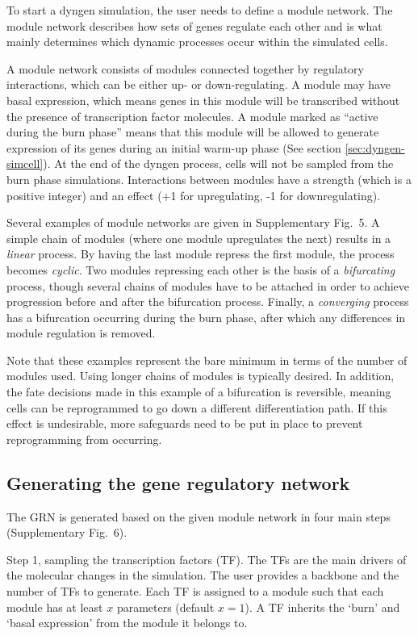 \documentclass[
  table,
  10pt,
  a4paper]{article}
\begin{document}
To start a dyngen simulation, the user needs to define a module network.
The module network describes how sets of genes regulate each other and
is what mainly determines which dynamic processes occur within the
simulated cells.

A module network consists of modules connected together by regulatory
interactions, which can be either up- or down-regulating. A module may
have basal expression, which means genes in this module will be
transcribed without the presence of transcription factor molecules. A
module marked as ``active during the burn phase'' means that this module
will be allowed to generate expression of its genes during an initial
warm-up phase (See section \ref{sec:dyngen-simcell}). At the end of the
dyngen process, cells will not be sampled from the burn phase
simulations. Interactions between modules have a strength (which is a
positive integer) and an effect (+1 for upregulating, -1 for
downregulating).

Several examples of module networks are given in Supplementary Fig.~5. A
simple chain of modules (where one module upregulates the next) results
in a \emph{linear} process. By having the last module repress the first
module, the process becomes \emph{cyclic}. Two modules repressing each
other is the basis of a \emph{bifurcating} process, though several
chains of modules have to be attached in order to achieve progression
before and after the bifurcation process. Finally, a \emph{converging}
process has a bifurcation occurring during the burn phase, after which
any differences in module regulation is removed.

Note that these examples represent the bare minimum in terms of the
number of modules used. Using longer chains of modules is typically
desired. In addition, the fate decisions made in this example of a
bifurcation is reversible, meaning cells can be reprogrammed to go down
a different differentiation path. If this effect is undesirable, more
safeguards need to be put in place to prevent reprogramming from
occurring.

\hypertarget{sec:dyngen-grn}{%
\subsection{Generating the gene regulatory
network}\label{sec:dyngen-grn}}

The GRN is generated based on the given module network in four main
steps (Supplementary Fig.~6).

Step 1, sampling the transcription factors (TF). The TFs are the main
drivers of the molecular changes in the simulation. The user provides a
backbone and the number of TFs to generate. Each TF is assigned to a
module such that each module has at least \(x\) parameters (default
\(x=1\)). A TF inherits the `burn' and `basal expression' from the
module it belongs to.
\end{document}

